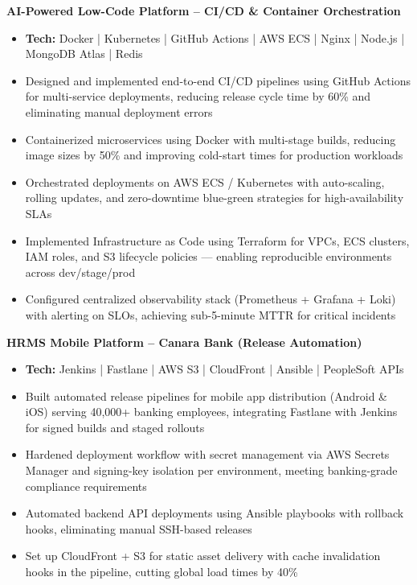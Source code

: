 \documentclass[11pt]{article}
\newcommand{\projectheading}[1]{
    \vspace{0.5pt}
    \textbf{\color{accentblue}#1}
    \vspace{0.5pt}
}
\begin{document}
\projectheading{AI-Powered Low-Code Platform -- CI/CD \& Container Orchestration}
\begin{itemize}
    \item \textbf{Tech:} Docker | Kubernetes | GitHub Actions | AWS ECS | Nginx | Node.js | MongoDB Atlas | Redis
    \item Designed and implemented end-to-end CI/CD pipelines using GitHub Actions for multi-service deployments, reducing release cycle time by 60\% and eliminating manual deployment errors
    \item Containerized microservices using Docker with multi-stage builds, reducing image sizes by 50\% and improving cold-start times for production workloads
    \item Orchestrated deployments on AWS ECS / Kubernetes with auto-scaling, rolling updates, and zero-downtime blue-green strategies for high-availability SLAs
    \item Implemented Infrastructure as Code using Terraform for VPCs, ECS clusters, IAM roles, and S3 lifecycle policies — enabling reproducible environments across dev/stage/prod
    \item Configured centralized observability stack (Prometheus + Grafana + Loki) with alerting on SLOs, achieving sub-5-minute MTTR for critical incidents
\end{itemize}

\projectheading{HRMS Mobile Platform -- Canara Bank (Release Automation)}
\begin{itemize}
    \item \textbf{Tech:} Jenkins | Fastlane | AWS S3 | CloudFront | Ansible | PeopleSoft APIs
    \item Built automated release pipelines for mobile app distribution (Android \& iOS) serving 40,000+ banking employees, integrating Fastlane with Jenkins for signed builds and staged rollouts
    \item Hardened deployment workflow with secret management via AWS Secrets Manager and signing-key isolation per environment, meeting banking-grade compliance requirements
    \item Automated backend API deployments using Ansible playbooks with rollback hooks, eliminating manual SSH-based releases
    \item Set up CloudFront + S3 for static asset delivery with cache invalidation hooks in the pipeline, cutting global load times by 40\%
\end{itemize}
\end{document}
